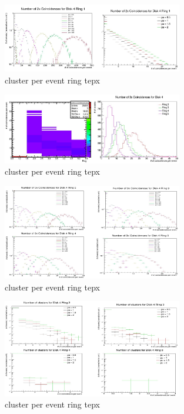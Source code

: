 \begin{figure}[!htp]
\centering
\includegraphics[width=0.7\textwidth]{ashish_thesis/twofoldcoin_low_allpu_D4R1.png}
\caption{%
  cluster per event ring tepx 
}
\label{fig:cluster_ring}
\end{figure}



\begin{figure}[!htp]
\centering
\includegraphics[width=0.7\textwidth]{ashish_thesis/threefoldcoin_D4_PU100.png}
\caption{%
  cluster per event ring tepx 
}
\label{fig:cluster_ring}
\end{figure}


\begin{figure}[!htp]
\centering
\includegraphics[width=0.7\textwidth]{ashish_thesis/threefoldcoin_D4_allpu.png}
\caption{%
  cluster per event ring tepx 
}
\label{fig:cluster_ring}
\end{figure}

\begin{figure}[!htp]
\centering
\includegraphics[width=0.7\textwidth]{ashish_thesis/threefoldcoin_D4_lowPU.png}
\caption{%
  cluster per event ring tepx 
}
\label{fig:cluster_ring}
\end{figure}




